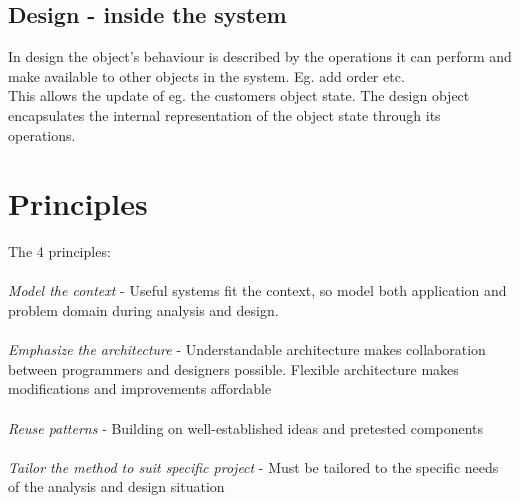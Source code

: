 \subsection*{Design - inside the system}
In design the object's behaviour is described by the operations it can perform and make available to other objects in the system. Eg. add order etc. \\
This allows the update of eg. the customers object state. The design object encapsulates the internal representation of the object state through its operations.\\

\section{Principles}
The 4 principles:
\\\\
\textit{Model the context} -
Useful systems fit the context, so model both application and problem domain during analysis and design.
\\\\
\textit{Emphasize the architecture} -
Understandable architecture makes collaboration between programmers and designers possible. Flexible architecture makes modifications and improvements affordable
\\\\
\textit{Reuse patterns} -
Building on well-established ideas and pretested components
\\\\
\textit{Tailor the method to suit specific project} -
Must be tailored to the specific needs of the analysis and design situation 
